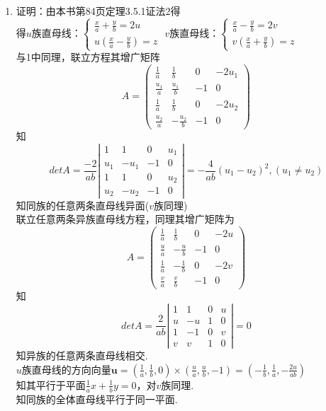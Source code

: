 \documentclass[UTF8]{ctexart}
\begin{document}
\begin{enumerate}
\item 证明：由本书第84页定理3.5.1证法2得\\
得$u$族直母线：$\left\{\begin{array}{l}\displaystyle\frac{x}{a}+\displaystyle\frac{y}{b}=2u\\u\left(\displaystyle\frac{x}{a}-\displaystyle\frac{y}{b}\right)=z\end{array}\right.$
$v$族直母线：$\left\{\begin{array}{l}\displaystyle\frac{x}{a}-\displaystyle\frac{y}{b}=2v\\v\left(\displaystyle\frac{x}{a}+\displaystyle\frac{y}{b}\right)=z\end{array}\right.$\\
与1中同理，联立方程其增广矩阵
$$A=\left(\begin{array}{cccc}\displaystyle\frac{1}{a}&\displaystyle\frac{1}{b}&0&-2u_1\\\displaystyle\frac{u_1}{a}&\displaystyle\frac{u_1}{b}&-1&0\\\displaystyle\frac{1}{a}&\displaystyle\frac{1}{b}&0&-2u_2\\\displaystyle\frac{u_2}{a}&\displaystyle-\frac{u_2}{b}&-1&0\end{array}\right)$$
知$$det A=\displaystyle\frac{-2}{ab}\left|\begin{array}{cccc}1&1&0&u_1\\u_1&-u_1&-1&0\\1&1&0&u_2\\u_2&-u_2&-1&0\end{array}\right|=\displaystyle-\frac{4}{ab}\left(u_1-u_2\right)^2,\left(u_1\neq u_2\right)$$
知同族的任意两条直母线异面($v$族同理)\\
联立任意两条异族直母线方程，同理其增广矩阵为
$$A=\left(\begin{array}{cccc}\displaystyle\frac{1}{a}&\displaystyle\frac{1}{b}&0&-2u\\\displaystyle\frac{u}{a}&\displaystyle-\frac{u}{b}&-1&0\\\displaystyle\frac{1}{a}&\displaystyle-\frac{1}{b}&0&-2v\\\displaystyle\frac{v}{a}&\displaystyle\frac{v}{b}&-1&0\end{array}\right)$$
知$$det A=\displaystyle\frac{2}{ab}\left|\begin{array}{cccc}1&1&0&u\\u&-u&1&0\\1&-1&0&v\\v&v&1&0\end{array}\right|=0$$
知异族的任意两条直母线相交.\\
$u$族直母线的方向向量$\mathbf{u}=\left(\displaystyle\frac{1}{a},\displaystyle\frac{1}{b},0\right)\times\left(\displaystyle\frac{u}{a},\displaystyle\frac{u}{b},-1\right)=\left(\displaystyle-\frac{1}{b},\displaystyle\frac{1}{a},\displaystyle-\frac{2u}{ab}\right)$\\
知其平行于平面$\displaystyle\frac{1}{a}x+\displaystyle\frac{1}{b}y=0$，对$v$族同理.\\
知同族的全体直母线平行于同一平面. 


\end{enumerate}
\end{document}
